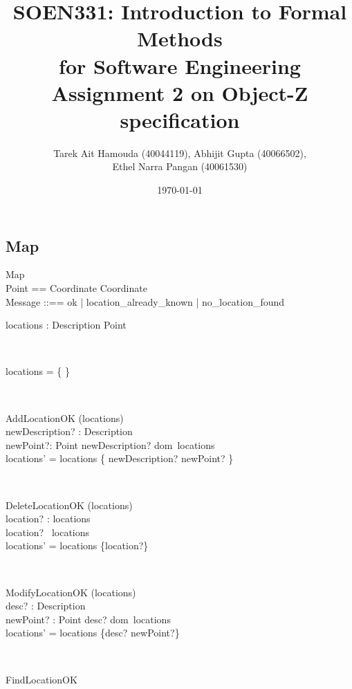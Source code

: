 \documentclass[12pt]{article}
\title{SOEN331: Introduction to Formal Methods\\for Software Engineering\\
Assignment 2 on Object-Z specification}
\author{Tarek Ait Hamouda (40044119), Abhijit Gupta (40066502),\\ 
Ethel Narra Pangan (40061530)}
\date{\today}
\begin{document}
\begin{spacing}{1.5}

\maketitle

\newpage

\section{Map}

\begin{class}{Map}
 \\
Point == Coordinate \times Coordinate \\
Message ::== ok | location\_already\_known | no\_location\_found \\
\begin{state}
locations : Description \pfun Point\\
\end{state} \\
\begin{init}
locations = \{ \}
\end{init} \\
\begin{op}{AddLocationOK}
\Delta (locations) \\
newDescription? : Description\\
newPoint?: Point 
\ST
newDescription? \notin dom~locations \\
locations' = locations \cup \{ newDescription? \to newPoint? \}
\end{op}\\
\begin{op}{DeleteLocationOK}
\Delta (locations) \\
location? : locations\\
\ST
location? \in ~locations\\
locations' = locations \setminus \{location?\}
\end{op}\\
\begin{op}{ModifyLocationOK}
\Delta (locations) \\
desc? : Description\\
newPoint? : Point
\ST
desc? \in dom~locations \\
locations' = locations \oplus \{desc? \to newPoint?\}
\end{op}\\ 
\begin{op}{FindLocationOK}

\end{op}
\end{class}
\end{spacing}
\end{document}
